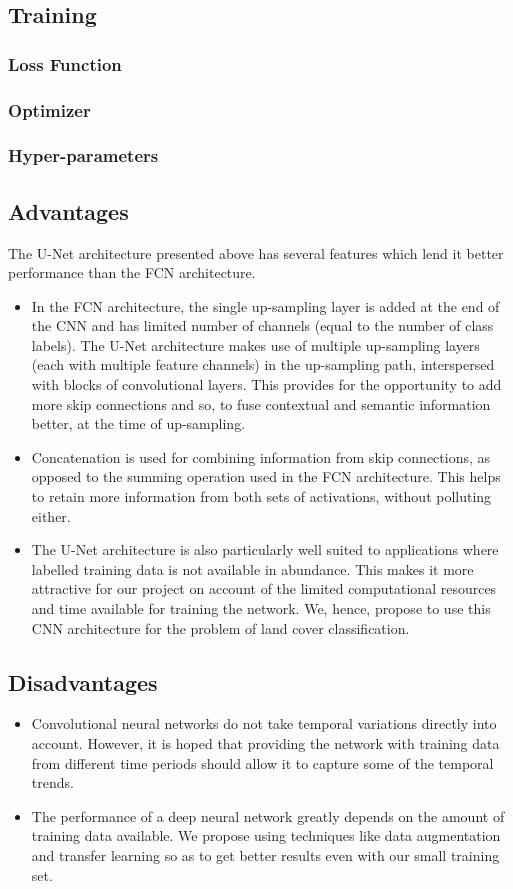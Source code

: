 \documentclass[12pt, a4paper]{report}
\begin{document}
\subsection{Training}
\subsubsection{Loss Function}
\subsubsection{Optimizer}
\subsubsection{Hyper-parameters}
\subsection{Advantages}
The U-Net architecture presented above has several features which lend it better performance than the FCN architecture.
\begin{itemize}
\item
In the FCN architecture, the single up-sampling layer is added at the end of the CNN and has limited number of channels (equal to the number of class labels). The U-Net architecture makes use of multiple up-sampling layers (each with multiple feature channels) in the up-sampling path, interspersed with blocks of convolutional layers. This provides for the opportunity to add more skip connections and so, to fuse contextual and semantic information better, at the time of up-sampling. 
\item
Concatenation is used for combining information from skip connections, as opposed to the summing operation used in the FCN architecture. This helps to retain more information from both sets of activations, without polluting either.
\item
The U-Net architecture is also particularly well suited to applications where labelled training data is not available in abundance. This makes it more attractive for our project on account of the limited computational resources and time available for training the network. We, hence, propose to use this CNN architecture for the problem of land cover classification.
\end{itemize}
\subsection{Disadvantages}
\begin{itemize}
\item Convolutional neural networks do not take temporal variations directly into account. However, it is hoped that providing the network with training data from different time periods should allow it to capture some of the temporal trends.
\item The performance of a deep neural network greatly depends on the amount of training data available. We propose using techniques like data augmentation and transfer learning so as to get better results even with our small training set.
\end{itemize}
\end{document}
